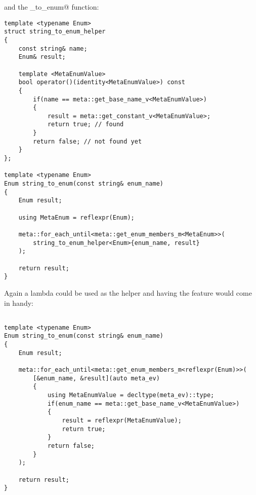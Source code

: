 and the \verb@string_to_enum@ function:

\begin{verbatim}
template <typename Enum>
struct string_to_enum_helper
{
	const string& name;
	Enum& result;

	template <MetaEnumValue>
	bool operator()(identity<MetaEnumValue>) const
	{
		if(name == meta::get_base_name_v<MetaEnumValue>)
		{
			result = meta::get_constant_v<MetaEnumValue>;
			return true; // found
		}
		return false; // not found yet
	}
};

template <typename Enum>
Enum string_to_enum(const string& enum_name)
{
	Enum result;

	using MetaEnum = reflexpr(Enum);

	meta::for_each_until<meta::get_enum_members_m<MetaEnum>>(
		string_to_enum_helper<Enum>{enum_name, result}
	);

	return result;
}
\end{verbatim}

Again a lambda could be used as the helper and having the 
feature would come in handy:

\begin{verbatim}

template <typename Enum>
Enum string_to_enum(const string& enum_name)
{
	Enum result;

	meta::for_each_until<meta::get_enum_members_m<reflexpr(Enum)>>(
		[&enum_name, &result](auto meta_ev)
		{
			using MetaEnumValue = decltype(meta_ev)::type;
			if(enum_name == meta::get_base_name_v<MetaEnumValue>)
			{
				result = reflexpr(MetaEnumValue);
				return true;
			}
			return false;
		}
	);

	return result;
}
\end{verbatim}

